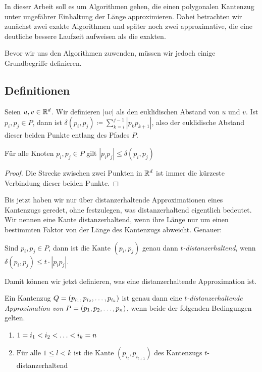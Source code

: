     In dieser Arbeit soll es um Algorithmen gehen, die einen polygonalen Kantenzug unter ungefährer Einhaltung der Länge approximieren. 
    Dabei betrachten wir zunächst zwei exakte Algorithmen und später noch zwei approximative, die eine deutliche bessere Laufzeit aufweisen als die exakten. 
    
    Bevor wir uns den Algorithmen zuwenden, müssen wir jedoch einige Grundbegriffe definieren.
   
   \subsection{Definitionen}
   \label{subsec:def}
   
    Seien $u, v \in \mathbb{R}^d$. Wir definieren $|uv|$ als den euklidischen Abstand von $u$ und $v$.
    Ist $p_i, p_j \in P$, dann ist $\delta(p_i, p_j) \coloneqq \sum\limits_{k=i}^{j-1}{|p_k
    p_{k+1}|}$, also der euklidische Abstand dieser beiden Punkte entlang des Pfades $P$.
	\begin{lemma}
		\label{lem:triangle}
		Für alle Knoten $p_i, p_j \in P$ gilt $|p_ip_j| \leq \delta(p_i, p_j)$
	\end{lemma}
	\begin{proof}
		Die Strecke zwischen zwei Punkten in $\mathbb{R}^d$ ist immer die kürzeste Verbindung dieser beiden Punkte.
	\end{proof}
	Bis jetzt haben wir nur über distanzerhaltende Approximationen eines Kantenzugs geredet, ohne  festzulegen, was distanzerhaltend eigentlich bedeutet. 
	Wir nennen eine Kante distanzerhaltend, wenn ihre Länge nur um einen bestimmten Faktor von der Länge des Kantenzugs abweicht. Genauer:
	\begin{definition}[$t$-distanzerhaltend]
		\label{def:t-dist}
		Sind $p_i, p_j \in P$, dann ist die Kante $(p_i, p_j)$ genau dann \emph{$t$-distanzerhaltend}, wenn $\delta(p_i, p_j) \leq t \cdot |p_ip_j|$.
	\end{definition}
	
	Damit können wir jetzt definieren, was eine distanzerhaltende Approximation ist.

	\begin{definition}
		\label{def:t-distapp}
		Ein Kantenzug $Q = (p_{i_1}, p_{i_2}, \mathellipsis, p_{i_k})$ ist genau dann eine \emph{$t$-distanzerhaltende Approximation von $P = (p_1, p_2, \mathellipsis, p_n)$}, wenn beide der folgenden Bedingungen gelten.
		\begin{enumerate}
			\item $\displaystyle 1 = i_1 < i_2 < \mathellipsis < i_k = n$
			\item $\displaystyle \text{Für alle } 1 \leq l < k \text{ ist die Kante } (p_{i_l}, p_{i_{l+1}})$ des Kantenzugs $t$-distanzerhaltend
		\end{enumerate}
	\end{definition}
	
